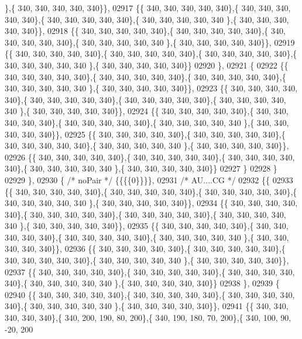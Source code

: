 \begin{DoxyCode}
      \},\{ 340, 340, 340, 340, 340\}\},
02917 \{\{ 340, 340, 340, 340, 340\},\{ 340, 340, 340, 340, 340\},\{ 340, 340, 340, 340, 340\},\{ 340, 340, 340, 340, 340
      \},\{ 340, 340, 340, 340, 340\}\},
02918 \{\{ 340, 340, 340, 340, 340\},\{ 340, 340, 340, 340, 340\},\{ 340, 340, 340, 340, 340\},\{ 340, 340, 340, 340, 340
      \},\{ 340, 340, 340, 340, 340\}\},
02919 \{\{ 340, 340, 340, 340, 340\},\{ 340, 340, 340, 340, 340\},\{ 340, 340, 340, 340, 340\},\{ 340, 340, 340, 340, 340
      \},\{ 340, 340, 340, 340, 340\}\}
02920 \},
02921 \{
02922 \{\{ 340, 340, 340, 340, 340\},\{ 340, 340, 340, 340, 340\},\{ 340, 340, 340, 340, 340\},\{ 340, 340, 340, 340, 340
      \},\{ 340, 340, 340, 340, 340\}\},
02923 \{\{ 340, 340, 340, 340, 340\},\{ 340, 340, 340, 340, 340\},\{ 340, 340, 340, 340, 340\},\{ 340, 340, 340, 340, 340
      \},\{ 340, 340, 340, 340, 340\}\},
02924 \{\{ 340, 340, 340, 340, 340\},\{ 340, 340, 340, 340, 340\},\{ 340, 340, 340, 340, 340\},\{ 340, 340, 340, 340, 340
      \},\{ 340, 340, 340, 340, 340\}\},
02925 \{\{ 340, 340, 340, 340, 340\},\{ 340, 340, 340, 340, 340\},\{ 340, 340, 340, 340, 340\},\{ 340, 340, 340, 340, 340
      \},\{ 340, 340, 340, 340, 340\}\},
02926 \{\{ 340, 340, 340, 340, 340\},\{ 340, 340, 340, 340, 340\},\{ 340, 340, 340, 340, 340\},\{ 340, 340, 340, 340, 340
      \},\{ 340, 340, 340, 340, 340\}\}
02927 \}
02928 \}
02929 \},
02930 \{ \textcolor{comment}{/* noPair */} \{\{\{\{0\}\}\}\},
02931 \textcolor{comment}{/* AU....CG */}
02932 \{\{
02933 \{\{ 340, 340, 340, 340, 340\},\{ 340, 340, 340, 340, 340\},\{ 340, 340, 340, 340, 340\},\{ 340, 340, 340, 340, 340
      \},\{ 340, 340, 340, 340, 340\}\},
02934 \{\{ 340, 340, 340, 340, 340\},\{ 340, 340, 340, 340, 340\},\{ 340, 340, 340, 340, 340\},\{ 340, 340, 340, 340, 340
      \},\{ 340, 340, 340, 340, 340\}\},
02935 \{\{ 340, 340, 340, 340, 340\},\{ 340, 340, 340, 340, 340\},\{ 340, 340, 340, 340, 340\},\{ 340, 340, 340, 340, 340
      \},\{ 340, 340, 340, 340, 340\}\},
02936 \{\{ 340, 340, 340, 340, 340\},\{ 340, 340, 340, 340, 340\},\{ 340, 340, 340, 340, 340\},\{ 340, 340, 340, 340, 340
      \},\{ 340, 340, 340, 340, 340\}\},
02937 \{\{ 340, 340, 340, 340, 340\},\{ 340, 340, 340, 340, 340\},\{ 340, 340, 340, 340, 340\},\{ 340, 340, 340, 340, 340
      \},\{ 340, 340, 340, 340, 340\}\}
02938 \},
02939 \{
02940 \{\{ 340, 340, 340, 340, 340\},\{ 340, 340, 340, 340, 340\},\{ 340, 340, 340, 340, 340\},\{ 340, 340, 340, 340, 340
      \},\{ 340, 340, 340, 340, 340\}\},
02941 \{\{ 340, 340, 340, 340, 340\},\{ 340, 200, 190,  80, 200\},\{ 340, 190, 180,  70, 200\},\{ 340, 100,  90, -20, 200

\end{DoxyCode}
